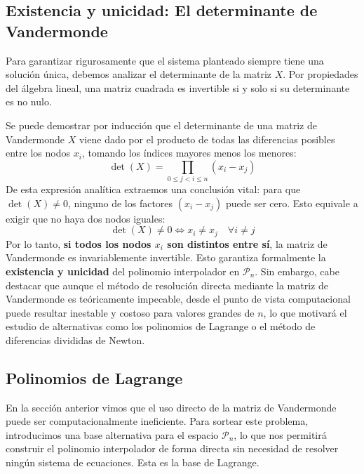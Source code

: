 \subsection{Existencia y unicidad: El determinante de Vandermonde}

Para garantizar rigurosamente que el sistema planteado siempre tiene una solución única, debemos analizar el determinante de la matriz $X$. Por propiedades del álgebra lineal, una matriz cuadrada es invertible si y solo si su determinante es no nulo.

Se puede demostrar por inducción que el determinante de una matriz de Vandermonde $X$ viene dado por el producto de todas las diferencias posibles entre los nodos $x_i$, tomando los índices mayores menos los menores:
\[
    \det(X) = \prod_{0 \leq j < i \leq n} (x_i - x_j)
\]
De esta expresión analítica extraemos una conclusión vital: para que $\det(X) \neq 0$, ninguno de los factores $(x_i - x_j)$ puede ser cero. Esto equivale a exigir que no haya dos nodos iguales:
\[
    \det(X) \neq 0 \iff x_i \neq x_j \quad \forall i \neq j
\]
Por lo tanto, \textbf{si todos los nodos $x_i$ son distintos entre sí}, la matriz de Vandermonde es invariablemente invertible. Esto garantiza formalmente la \textbf{existencia y unicidad} del polinomio interpolador en $\mathcal{P}_n$. Sin embargo, cabe destacar que aunque el método de resolución directa mediante la matriz de Vandermonde es teóricamente impecable, desde el punto de vista computacional puede resultar inestable y costoso para valores grandes de $n$, lo que motivará el estudio de alternativas como los polinomios de Lagrange o el método de diferencias divididas de Newton.
\subsection{Polinomios de Lagrange}

En la sección anterior vimos que el uso directo de la matriz de Vandermonde puede ser computacionalmente ineficiente. Para sortear este problema, introducimos una base alternativa para el espacio $\mathcal{P}_n$, lo que nos permitirá construir el polinomio interpolador de forma directa sin necesidad de resolver ningún sistema de ecuaciones. Esta es la base de Lagrange.

